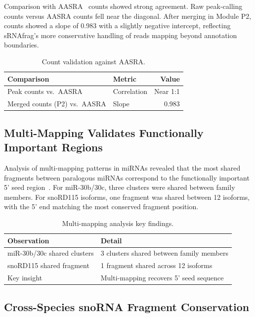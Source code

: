 \documentclass[11pt]{article}
\begin{document}
Comparison with AASRA~\citep{shi2022aasra} counts showed strong agreement.  Raw peak-calling counts versus AASRA counts fell near the diagonal.  After merging in Module P2, counts showed a slope of 0.983 with a slightly negative intercept, reflecting sRNAfrag's more conservative handling of reads mapping beyond annotation boundaries.

\begin{table}[ht]
\centering
\caption{Count validation against AASRA.}
\label{tab:countval}
\begin{tabular}{@{}llr@{}}
\toprule
Comparison & Metric & Value \\
\midrule
Peak counts vs.\ AASRA & Correlation & Near 1:1 \\
Merged counts (P2) vs.\ AASRA & Slope & 0.983 \\
\bottomrule
\end{tabular}
\end{table}

\subsection{Multi-Mapping Validates Functionally Important Regions}

Analysis of multi-mapping patterns in miRNAs revealed that the most shared fragments between paralogous miRNAs correspond to the functionally important 5' seed region~\citep{bartel2004micrornas,telonis2015beyond}.  For miR-30b/30c, three clusters were shared between family members.  For snoRD115 isoforms, one fragment was shared between 12 isoforms, with the 5' end matching the most conserved fragment position.

\begin{table}[ht]
\centering
\caption{Multi-mapping analysis key findings.}
\label{tab:multimapping}
\begin{tabular}{@{}ll@{}}
\toprule
Observation & Detail \\
\midrule
miR-30b/30c shared clusters & 3 clusters shared between family members \\
snoRD115 shared fragment & 1 fragment shared across 12 isoforms \\
Key insight & Multi-mapping recovers 5' seed sequence \\
\bottomrule
\end{tabular}
\end{table}

\subsection{Cross-Species snoRNA Fragment Conservation}
\end{document}
